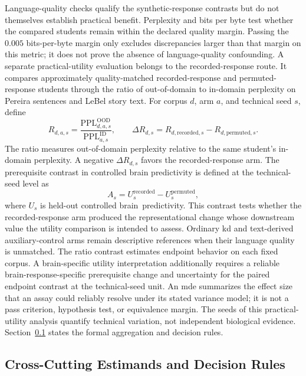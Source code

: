 Language-quality checks qualify the synthetic-response contrasts but do not themselves establish practical benefit.
Perplexity and bits per byte test whether the compared students remain within the declared quality margin.
Passing the \(0.005\) bits-per-byte margin only excludes discrepancies larger than that margin on this metric; it does not prove the absence of language-quality confounding.
A separate practical-utility evaluation belongs to the recorded-response route.
It compares approximately quality-matched recorded-response and permuted-response students through the ratio of out-of-domain to in-domain perplexity on Pereira sentences and LeBel story text.
For corpus \(d\), arm \(a\), and technical seed \(s\), define
\begin{equation}
R_{d,a,s}
=
\frac{
\mathrm{PPL}^{\mathrm{OOD}}_{d,a,s}
}{
\mathrm{PPL}^{\mathrm{ID}}_{a,s}
},
\qquad
\Delta R_{d,s}
=
R_{d,\mathrm{recorded},s}
-
R_{d,\mathrm{permuted},s}.
\label{eq:practical-utility-ratio}
\end{equation}
 The ratio measures out-of-domain perplexity relative to the same student's in-domain perplexity.
A negative \(\Delta R_{d,s}\) favors the recorded-response arm.
The prerequisite contrast in controlled brain predictivity is defined at the technical-seed level as
\begin{equation}
A_s
=
U_s^{\mathrm{recorded}}
-
U_s^{\mathrm{permuted}},
\label{eq:practical-utility-prerequisite}
\end{equation}
where \(U_s\) is held-out controlled brain~\mbox{predictivity}.
This contrast tests whether the recorded-response arm produced the representational change whose downstream value the utility comparison is intended to assess.
Ordinary \ac{kd} and text-derived auxiliary-control arms remain descriptive references when their language quality is unmatched.
The ratio contrast estimates endpoint behavior on each fixed corpus.
A brain-specific utility interpretation additionally requires a reliable brain-response-specific prerequisite change and uncertainty for the paired endpoint contrast at the technical-seed unit.
An \ac{mde} summarizes the effect size that an assay could reliably resolve under its stated variance model; it is not a pass criterion, hypothesis test, or equivalence margin.
The seeds of this practical-utility analysis quantify technical variation, not independent biological evidence.
Section~\ref{sec:estimands} states the formal aggregation and decision rules.

\subsection{Cross-Cutting Estimands and Decision Rules}
\label{sec:estimands}


